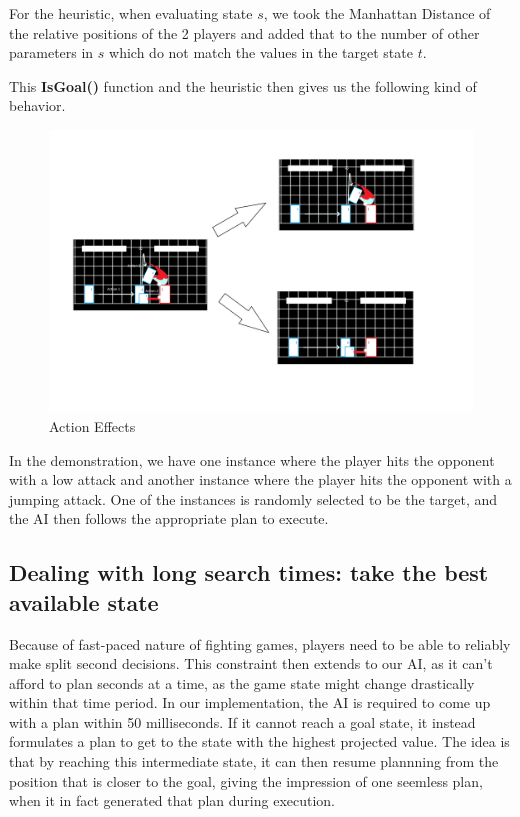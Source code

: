 \documentclass{article}
\begin{document}
For the heuristic, when evaluating state $s$, we took the Manhattan Distance of the relative positions of the 2 players and added that to the number of other parameters in $s$ which do not match the values in the target state $t$.

This \textbf{IsGoal()} function and the heuristic then gives us the following kind of behavior.

\begin{figure}[t]
	\centering
	\includegraphics[width=\textwidth]{DecisionMaking.png}
	\caption{Action Effects}
	\label{ActionEffects}
\end{figure}

In the demonstration, we have one instance where the player hits the opponent with a low attack and another instance where the player hits the opponent with a jumping attack. One of the instances is randomly selected to be the target, and the AI then follows the appropriate plan to execute.


\subsection{Dealing with long search times: take the best available state}
Because of fast-paced nature of fighting games, players need to be able to reliably make split second decisions. This constraint then extends to our AI, as it can't afford to plan seconds at a time, as the game state might change drastically within that time period. In our implementation, the AI is required to come up with a plan within 50 milliseconds. If it cannot reach a goal state, it instead formulates a plan to get to the state with the highest projected value. The idea is that by reaching this intermediate state, it can then resume plannning from the position that is closer to the goal, giving the impression of one seemless plan, when it in fact generated that plan during execution.
\end{document}
